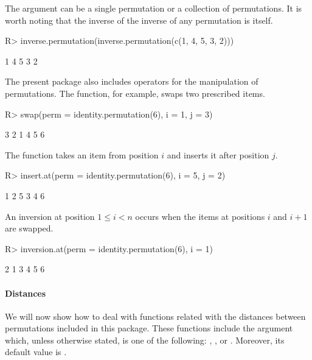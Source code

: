 \documentclass[article,nojss]{jss}
\begin{document}
The argument  can be a single permutation or a collection of permutations. It is worth noting that the inverse of the inverse of any permutation is itself.
\begin{Schunk}
\begin{Sinput}
R> inverse.permutation(inverse.permutation(c(1, 4, 5, 3, 2)))
\end{Sinput}
\begin{Soutput}
[1] 1 4 5 3 2
\end{Soutput}
\end{Schunk}

The present package also includes operators for the manipulation of permutations. The  function, for example, swaps two prescribed items. 
\begin{Schunk}
\begin{Sinput}
R> swap(perm = identity.permutation(6), i = 1, j = 3)
\end{Sinput}
\begin{Soutput}
[1] 3 2 1 4 5 6
\end{Soutput}
\end{Schunk}

The  function takes an item from position $i$ and inserts it after position $j$. 
\begin{Schunk}
\begin{Sinput}
R> insert.at(perm = identity.permutation(6), i = 5, j = 2)
\end{Sinput}
\begin{Soutput}
[1] 1 2 5 3 4 6
\end{Soutput}
\end{Schunk}

An inversion at position $1 \leq i < n$ occurs when the items at positions $i$ and $i+1$ are swapped. 
\begin{Schunk}
\begin{Sinput}
R> inversion.at(perm = identity.permutation(6), i = 1)
\end{Sinput}
\begin{Soutput}
[1] 2 1 3 4 5 6
\end{Soutput}
\end{Schunk}

\paragraph*{Distances}
We will now show how to deal with functions related with the distances between permutations included in this package. These functions include the argument  which, unless otherwise stated, is one of the following: , ,  or . Moreover, its default value is .
\end{document}

